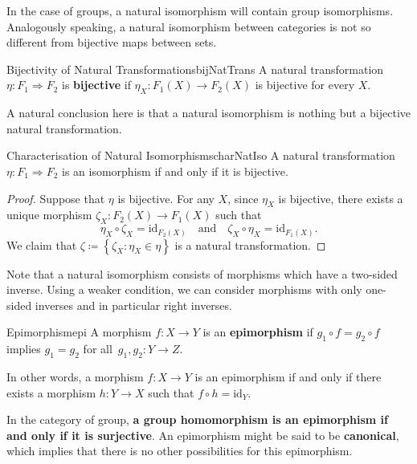 \documentclass[math]{amznotes}
\theoremstyle{remark}
\newcommand{\0}{\mathbf{0}}
\newcommand{\1}{\mathbf{1}}
\begin{document}
In the case of groups, a natural isomorphism will contain group isomorphisms. Analogously speaking, a natural isomorphism between categories is not so different from bijective maps between sets.
\begin{dfnbox}{Bijectivity of Natural Transformations}{bijNatTrans}
    A natural transformation $\eta \colon F_1 \Rightarrow F_2$ is {\color{red} \textbf{bijective}} if $\eta_X \colon F_1\left(X\right) 
    \to F_2\left(X\right)$ is bijective for every $X$.
\end{dfnbox}
A natural conclusion here is that a natural isomorphism is nothing but a bijective natural transformation.
\begin{probox}{Characterisation of Natural Isomorphisms}{charNatIso}
    A natural transformation $\eta \colon F_1 \Rightarrow F_2$ is an isomorphism if and only if it is bijective.
    \tcblower
    \begin{proof}
        Suppose that $\eta$ is bijective. For any $X$, since $\eta_X$ is bijective, there exists a unique morphism $\zeta_X \colon F_2\left(X\right) \to F_1\left(X\right)$ such that 
        \begin{equation*}
            \eta_X \circ \zeta_X = \mathrm{id}_{F_2\left(X\right)} \quad\textrm{and}\quad \zeta_X \circ \eta_X = \mathrm{id}_{F_1\left(X\right)}.
        \end{equation*}
        We claim that $\zeta \coloneqq \left\{\zeta_X \colon \eta_X \in \eta\right\}$ is a natural transformation.
    \end{proof}
\end{probox}
Note that a natural isomorphism consists of morphisms which have a two-sided inverse. Using a weaker condition, we can consider morphisms with only one-sided inverses and in particular right inverses.
\begin{dfnbox}{Epimorphism}{epi}
    A morphism $f \colon X \to Y$ is an {\color{red} \textbf{epimorphism}} if $g_1 \circ f = g_2 \circ f$ implies $g_1 = g_2$ for all~$g_1, g_2 \colon Y \to Z$.
\end{dfnbox}
In other words, a morphism $f \colon X \to Y$ is an epimorphism if and only if there exists a morphism $h \colon Y \to X$ such that $f \circ h = \mathrm{id}_Y$. 

In the category of group, \textbf{a group homomorphism is an epimorphism if and only if it is surjective}. An epimorphism might be said to be \textbf{canonical}, which implies that there is no other possibilities for this epimorphism.
\end{document}
